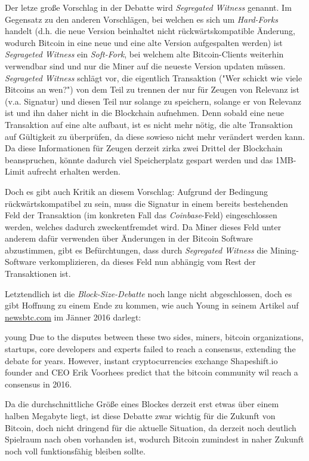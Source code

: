 Der letze große Vorschlag in der Debatte wird \emph{Segregated Witness} genannt.
Im Gegensatz zu den anderen Vorschlägen, bei welchen es sich um \emph{Hard-Forks} handelt (d.h. die neue Version beinhaltet nicht rückwärtskompatible Änderung, wodurch Bitcoin in eine neue und eine alte Version aufgespalten werden) ist \emph{Segrageted Witness} ein \emph{Soft-Fork}, bei welchem alte Bitcoin-Clients weiterhin verwendbar sind und nur die Miner auf die neueste Version updaten müssen.
\emph{Segrageted Witness} schlägt vor, die eigentlich Transaktion ("Wer schickt wie viele Bitcoins an wen?") von dem Teil zu trennen der nur für Zeugen von Relevanz ist (v.a. Signatur) und diesen Teil nur solange zu speichern, solange er von Relevanz ist und ihn daher nicht in die Blockchain aufnehmen.
Denn sobald eine neue Transaktion auf eine alte aufbaut, ist es nicht mehr nötig, die alte Transaktion auf Gültigkeit zu überprüfen, da diese sowieso nicht mehr verändert werden kann.
Da diese Informationen für Zeugen derzeit zirka zwei Drittel der Blockchain beanspruchen, könnte dadurch viel Speicherplatz gespart werden und das 1MB-Limit aufrecht erhalten werden.

Doch es gibt auch Kritik an diesem Vorschlag:
Aufgrund der Bedingung rückwärtskompatibel zu sein, muss die Signatur in einem bereits bestehenden Feld der Transaktion (im konkreten Fall das \emph{Coinbase}-Feld) eingeschlossen werden, welches dadurch zweckentfremdet wird.
Da Miner dieses Feld unter anderem dafür verwenden über Änderungen in der Bitcoin Software abzustimmen, gibt es Befürchtungen, dass durch \emph{Segregated Witness} die Mining-Software verkomplizieren, da dieses Feld nun abhängig vom Rest der Transaktionen ist.

Letztendlich ist die \emph{Block-Size-Debatte} noch lange nicht abgeschlossen, doch es gibt Hoffnung zu einem Ende zu kommen, wie auch Young in seinem Artikel auf \url{newsbtc.com} im Jänner 2016 darlegt:

\begin{longquote}{young}
Due to the disputes between these two sides, miners, bitcoin organizations, startups, core developers and experts failed to reach a consensus, extending the debate for years.
However, instant cryptocurrencies exchange Shapeshift.io founder and CEO Erik Voorhees predict that the bitcoin community wil reach a consensus in 2016.
\end{longquote}

Da die durchschnittliche Größe eines Blockes derzeit erst etwas über einem halben Megabyte liegt, ist diese Debatte zwar wichtig für die Zukunft von Bitcoin, doch nicht dringend für die aktuelle Situation, da derzeit noch deutlich Spielraum nach oben vorhanden ist, wodurch Bitcoin zumindest in naher Zukunft noch voll funktionsfähig bleiben sollte.
